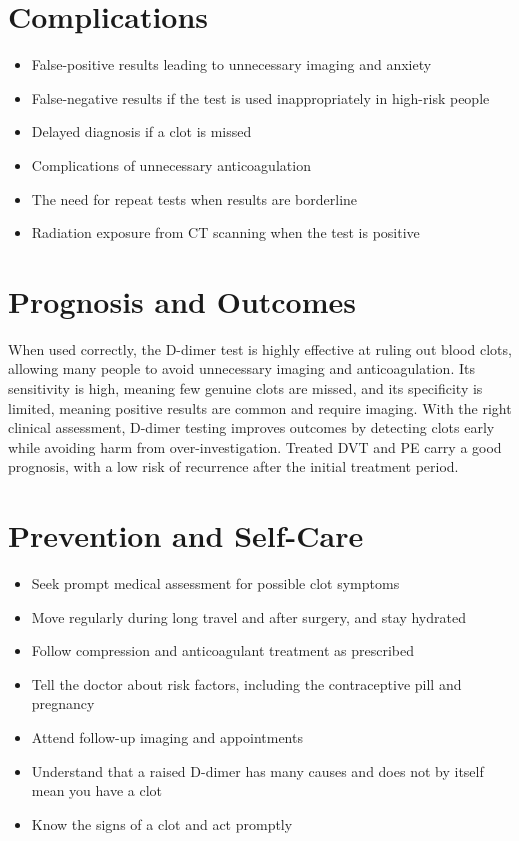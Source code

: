\section*{Complications}
\begin{itemize}
    \item False-positive results leading to unnecessary imaging and anxiety
    \item False-negative results if the test is used inappropriately in high-risk people
    \item Delayed diagnosis if a clot is missed
    \item Complications of unnecessary anticoagulation
    \item The need for repeat tests when results are borderline
    \item Radiation exposure from CT scanning when the test is positive
\end{itemize}

\section*{Prognosis and Outcomes}
When used correctly, the D-dimer test is highly effective at ruling out blood clots, allowing many people to avoid unnecessary imaging and anticoagulation. Its sensitivity is high, meaning few genuine clots are missed, and its specificity is limited, meaning positive results are common and require imaging. With the right clinical assessment, D-dimer testing improves outcomes by detecting clots early while avoiding harm from over-investigation. Treated DVT and PE carry a good prognosis, with a low risk of recurrence after the initial treatment period.

\section*{Prevention and Self-Care}
\begin{itemize}
    \item Seek prompt medical assessment for possible clot symptoms
    \item Move regularly during long travel and after surgery, and stay hydrated
    \item Follow compression and anticoagulant treatment as prescribed
    \item Tell the doctor about risk factors, including the contraceptive pill and pregnancy
    \item Attend follow-up imaging and appointments
    \item Understand that a raised D-dimer has many causes and does not by itself mean you have a clot
    \item Know the signs of a clot and act promptly
\end{itemize}

